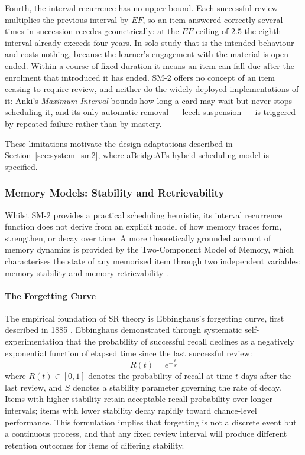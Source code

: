 Fourth, the interval recurrence has no upper bound. Each successful review multiplies the previous interval by $EF$, so an item answered correctly several times in succession recedes geometrically: at the $EF$ ceiling of $2.5$ the eighth interval already exceeds four years. In solo study that is the intended behaviour and costs nothing, because the learner's engagement with the material is open-ended. Within a course of fixed duration it means an item can fall due after the enrolment that introduced it has ended. SM-2 offers no concept of an item ceasing to require review, and neither do the widely deployed implementations of it: Anki's \textit{Maximum Interval} bounds how long a card may wait but never stops scheduling it, and its only automatic removal --- leech suspension --- is triggered by repeated failure rather than by mastery.

These limitations motivate the design adaptations described in Section~\ref{sec:system_sm2}, where aBridgeAI's hybrid scheduling model is specified.

\subsubsection{Memory Models: Stability and Retrievability}

Whilst SM-2 provides a practical scheduling heuristic, its interval recurrence function does not derive from an explicit model of how memory traces form, strengthen, or decay over time. A more theoretically grounded account of memory dynamics is provided by the Two-Component Model of Memory, which characterises the state of any memorised item through two independent variables: memory stability and memory retrievability \cite{wozniak1995twocomponents}.

\paragraph{The Forgetting Curve}
The empirical foundation of SR theory is Ebbinghaus's forgetting curve, first described in 1885 \cite{ebbinghaus1885}. Ebbinghaus demonstrated through systematic self-experimentation that the probability of successful recall declines as a negatively exponential function of elapsed time since the last successful review:
\begin{equation}
R(t) = e^{-\frac{t}{S}}
\end{equation}
where $R(t) \in [0, 1]$ denotes the probability of recall at time $t$ days after the last review, and $S$ denotes a stability parameter governing the rate of decay. Items with higher stability retain acceptable recall probability over longer intervals; items with lower stability decay rapidly toward chance-level performance. This formulation implies that forgetting is not a discrete event but a continuous process, and that any fixed review interval will produce different retention outcomes for items of differing stability.

